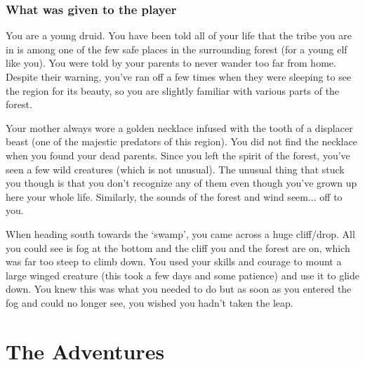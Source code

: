 \subsubsection{What was given to the player}

You are a young druid. You have been told all of your life that the tribe you are in is among one of the few safe places in the surrounding forest (for a young elf like you). You were told by your parents to never wander too far from home. Despite their warning, you've ran off a few times when they were sleeping to see the region for its beauty, so you are slightly familiar with various parts of the forest.

Your mother always wore a golden necklace infused with the tooth of a displacer beast (one of the majestic predators of this region). You did not find the necklace when you found your dead parents. Since you left the spirit of the forest, you've seen a few wild creatures (which is not unusual). The unusual thing that stuck you though is that you don't recognize any of them even though you've grown up here your whole life. Similarly, the sounds of the forest and wind seem... off to you. 

When heading south towards the `swamp', you came across a huge cliff/drop. All you could see is fog at the bottom and the cliff you and the forest are on, which was far too steep to climb down. You used your skills and courage to mount a large winged creature (this took a few days and some patience) and use it to glide down. You knew this was what you needed to do but as soon as you entered the fog and could no longer see, you wished you hadn't taken the leap.

\section{The Adventures}












